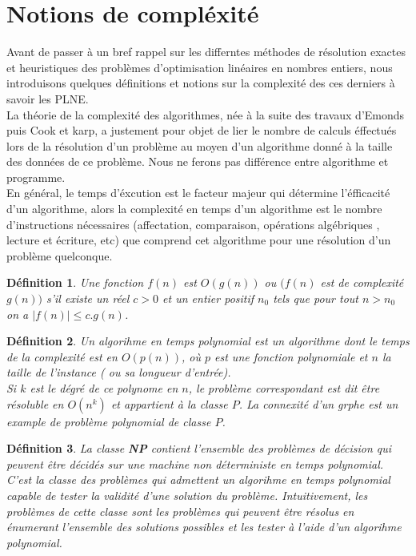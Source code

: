 \documentclass[a4paper,11pt,oneside]{report}
\theoremstyle{plain}
\newtheorem{definition}{D\'efinition}[section]
\newcommand{\0}{/ \! \! \! 0}
\theoremstyle{plain}
\begin{document}
\section{Notions de compl\'exit\'e}
Avant de passer \`a un bref rappel sur les differntes m\'ethodes de r\'esolution exactes et heuristiques des probl\`emes d'optimisation
lin\'eaires en nombres entiers, nous introduisons quelques d\'efinitions et notions sur la complexit\'e des ces derniers \`a savoir les
PLNE.\\ La th\'eorie de la complexit\'e des algorithmes, n\'ee \`a la suite des travaux d'Emonds puis Cook et karp, a justement pour objet
 de lier le nombre de calculs \'effectu\'es lors de la r\'esolution d'un probl\`eme au moyen d'un algorithme donn\'e \`a la taille des 
 donn\'ees de ce probl\`eme. Nous ne ferons pas diff\'erence entre algorithme et programme.\\
 En g\'en\'eral, le temps d'\'excution est le facteur majeur qui d\'etermine l'\'efficacit\'e d'un algorithme, alors la complexit\'e en temps 
 d'un algorithme est le nombre d'instructions n\'ecessaires (affectation, comparaison, op\'erations alg\'ebriques , lecture et \'ecriture,
 etc) que comprend cet algorithme pour une r\'esolution d'un probl\`eme quelconque.
\begin{definition}
 Une fonction $f(n)$ est $O(g(n))$ ou $(f(n)$ est de complexit\'e $g(n))$ s'il existe un r\'eel $c>0$ et un entier positif $n_0$ tels que
 pour tout $n>n_0$ on a $|f(n)| \leq c.g(n)$.
\end{definition}
\begin{definition}
 Un algorihme en temps polynomial est un algorithme dont le temps de la complexit\'e est en $O(p(n))$, o\`u $p$ est une fonction polynomiale
  et $n$ la taille de l'instance ( ou sa longueur d'entr\'ee).\\
 Si $k$ est le d\'egr\'e de ce polynome en $n$, le probl\`eme correspondant est dit \^etre r\'esoluble en $O(n^k)$ et appartient \`a la classe $P$. 
 La connexit\'e d'un grphe est un example de probl\`eme polynomial de classe $P$.
 \end{definition}
\begin{definition}
 La classe {\bf NP} contient l'ensemble des probl\`emes de d\'ecision qui peuvent \^etre d\'ecid\'es sur une machine non d\'eterministe en temps polynomial.
 C'est la classe des probl\`emes qui admettent un algorihme en temps polynomial capable de tester la validit\'e d'une solution du probl\`eme.
 Intuitivement, les probl\`emes de cette classe sont les probl\`emes qui peuvent \^etre r\'esolus en \'enumerant l'ensemble des solutions possibles et
  les tester \`a l'aide d'un algorihme polynomial.
 \end{definition}
\end{document}
